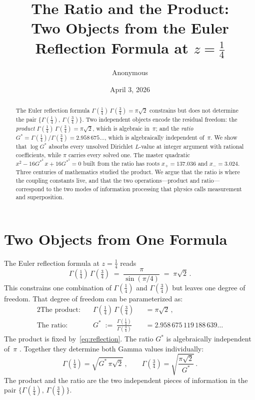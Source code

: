 \documentclass[12pt,reqno]{amsart}
\title{The Ratio and the Product:\\[2pt]
  Two Objects from the Euler Reflection Formula at $z=\tfrac14$}
\author{Anonymous}
\date{April 3, 2026}
\theoremstyle{definition}
\theoremstyle{remark}
\newcommand{\Gstar}{G^{\!*}}
\begin{document}
\begin{abstract}
The Euler reflection formula $\Gamma(\tfrac14)\,\Gamma(\tfrac34)=\pi\sqrt{2}$ constrains
but does not determine the pair $\{\Gamma(\tfrac14),\,\Gamma(\tfrac34)\}$. Two independent
objects encode the residual freedom: the \emph{product}
$\Gamma(\tfrac14)\,\Gamma(\tfrac34)=\pi\sqrt{2}$, which is algebraic in~$\pi$; and the
\emph{ratio} $\Gstar=\Gamma(\tfrac14)/\Gamma(\tfrac34)=2.958\,675\ldots$, which is
algebraically independent of~$\pi$. We show that $\log\Gstar$ absorbs every unsolved
Dirichlet $L$-value at integer argument with rational coefficients, while $\pi$ carries
every solved one. The master quadratic $x^2-16\Gstar^2\,x+16\Gstar^3=0$ built from the
ratio has roots $x_+=137.036$ and $x_-=3.024$. Three centuries of mathematics studied
the product. We argue that the ratio is where the coupling constants live, and that the
two operations---product and ratio---correspond to the two modes of information processing
that physics calls measurement and superposition.
\end{abstract}

\maketitle

\section{Two Objects from One Formula}

The Euler reflection formula at $z=\tfrac14$ reads
\begin{equation}\label{eq:reflection}
  \Gamma\!\left(\tfrac14\right)\,\Gamma\!\left(\tfrac34\right)
  \;=\; \frac{\pi}{\sin(\pi/4)}
  \;=\; \pi\sqrt{2}\,.
\end{equation}
This constrains one combination of $\Gamma(\tfrac14)$ and $\Gamma(\tfrac34)$ but leaves
one degree of freedom. That degree of freedom can be parameterized as:
\begin{alignat}{2}
  \text{The product:}&\quad \Gamma\!\left(\tfrac14\right)\,\Gamma\!\left(\tfrac34\right)
  &&= \pi\sqrt{2}\,,
  \label{eq:product}\\[4pt]
  \text{The ratio:}&\quad
  \Gstar \;:=\; \frac{\Gamma(\tfrac14)}{\Gamma(\tfrac34)}
  &&= 2.958\,675\,119\,188\,639\ldots
  \label{eq:ratio}
\end{alignat}
The product is fixed by~\eqref{eq:reflection}. The ratio $\Gstar$ is algebraically
independent of~$\pi$ \cite{Chudnovsky1980,Nesterenko1996}. Together they determine both
Gamma values individually:
\begin{equation}
  \Gamma\!\left(\tfrac14\right) = \sqrt{\Gstar\,\pi\sqrt{2}}\,,\qquad
  \Gamma\!\left(\tfrac34\right) = \sqrt{\frac{\pi\sqrt{2}}{\Gstar}}\,.
\end{equation}
The product and the ratio are the two independent pieces of information in the
pair $\{\Gamma(\tfrac14),\,\Gamma(\tfrac34)\}$.
\end{document}
